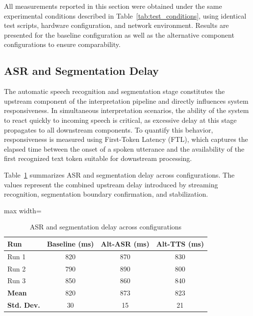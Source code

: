 All measurements reported in this section were obtained under the same experimental conditions described in Table~\ref{tab:test_conditions}, using identical test scripts, hardware configuration, and network environment. Results are presented for the baseline configuration as well as the alternative component configurations to ensure comparability.

\subsection{ASR and Segmentation Delay}
\label{sec:asr_segmentation_delay}

The automatic speech recognition and segmentation stage constitutes the upstream component of the interpretation pipeline and directly influences system responsiveness. In simultaneous interpretation scenarios, the ability of the system to react quickly to incoming speech is critical, as excessive delay at this stage propagates to all downstream components. To quantify this behavior, responsiveness is measured using First-Token Latency (FTL), which captures the elapsed time between the onset of a spoken utterance and the availability of the first recognized text token suitable for downstream processing.

Table~\ref{tab:asr_segmentation_delay} summarizes ASR and segmentation delay across configurations. The values represent the combined upstream delay introduced by streaming recognition, segmentation boundary confirmation, and stabilization.

\begin{table}[!htbp]
\centering
\caption[ASR and segmentation delay]{ASR and segmentation delay across configurations}
\label{tab:asr_segmentation_delay}
\begin{adjustbox}{max width=\textwidth}
\begin{tabular}{lccc}
\toprule
\textbf{Run} & \textbf{Baseline (ms)} & \textbf{Alt-ASR (ms)} & \textbf{Alt-TTS (ms)} \\
\midrule
Run 1 & 820 & 870 & 830 \\
Run 2 & 790 & 890 & 800 \\
Run 3 & 850 & 860 & 840 \\
\midrule
\textbf{Mean} & 820 & 873 & 823 \\
\textbf{Std. Dev.} & 30 & 15 & 21 \\
\bottomrule
\end{tabular}
\end{adjustbox}
\end{table}

